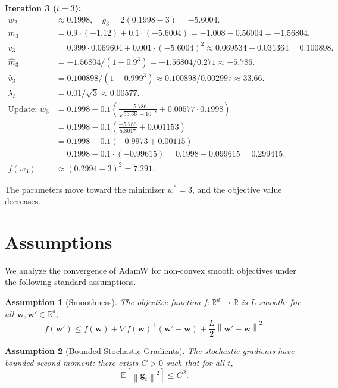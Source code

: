 \documentclass{article}
\theoremstyle{plain}
\newtheorem{assumption}{Assumption}
\theoremstyle{definition}
\renewcommand{\vec}[1]{\boldsymbol{#1}}
\newcommand{\norm}[1]{\left\| #1 \right\|}
\newcommand{\expect}[1]{\mathbb{E}\left[ #1 \right]}
\newcommand{\R}{\mathbb{R}}
\begin{document}
\textbf{Iteration 3 ($t=3$):}
\begin{align*}
    w_2 &\approx 0.1998, \quad g_3 = 2(0.1998 - 3) = -5.6004. \\
    m_3 &= 0.9 \cdot (-1.12) + 0.1 \cdot (-5.6004) = -1.008 - 0.56004 = -1.56804. \\
    v_3 &= 0.999 \cdot 0.069604 + 0.001 \cdot (-5.6004)^2 \approx 0.069534 + 0.031364 = 0.100898. \\
    \hat{m}_3 &= -1.56804 / (1 - 0.9^3) = -1.56804 / 0.271 \approx -5.786. \\
    \hat{v}_3 &= 0.100898 / (1 - 0.999^3) \approx 0.100898 / 0.002997 \approx 33.66. \\
    \lambda_3 &= 0.01 / \sqrt{3} \approx 0.00577. \\
    \text{Update: } w_3 &= 0.1998 - 0.1 \left( \frac{-5.786}{\sqrt{33.66} + 10^{-8}} + 0.00577 \cdot 0.1998 \right) \\
    &= 0.1998 - 0.1 \left( \frac{-5.786}{5.8017} + 0.001153 \right) \\
    &= 0.1998 - 0.1 \left( -0.9973 + 0.00115 \right) \\
    &= 0.1998 - 0.1 \cdot (-0.99615) = 0.1998 + 0.099615 = 0.299415. \\
    f(w_3) &\approx (0.2994 - 3)^2 = 7.291.
\end{align*}

The parameters move toward the minimizer $w^* = 3$, and the objective value decreases.

\section*{Assumptions}

We analyze the convergence of AdamW for non-convex smooth objectives under the following standard assumptions.

\begin{assumption}[Smoothness] \label{asm:smooth}
The objective function $f: \R^d \to \R$ is $L$-smooth: for all $\vec{w}, \vec{w}' \in \R^d$,
\begin{equation}
    f(\vec{w}') \le f(\vec{w}) + \nabla f(\vec{w})^\top (\vec{w}' - \vec{w}) + \frac{L}{2} \norm{\vec{w}' - \vec{w}}^2.
\end{equation}
\end{assumption}

\begin{assumption}[Bounded Stochastic Gradients] \label{asm:bounded_grad}
The stochastic gradients have bounded second moment: there exists $G > 0$ such that for all $t$,
\begin{equation}
    \expect{\norm{\vec{g}_t}^2} \le G^2.
\end{equation}
\end{assumption}
\end{document}
